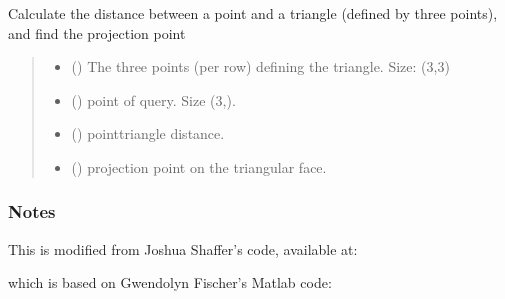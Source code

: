 \documentclass[letterpaper,10pt,english]{sphinxmanual}
\begin{document}
\begin{fulllineitems}
\label{\detokenize{_autosummary/nirfasterff.utils.pointTriangleDistance:nirfasterff.utils.pointTriangleDistance}}
\pysigstartsignatures
\pysiglinewithargsret
{}
{\sphinxparamcomma {}}
{}
\pysigstopsignatures
\sphinxAtStartPar
Calculate the distance between a point and a triangle (defined by three points), and find the projection point
\begin{quote}\begin{description}
\begin{itemize}
\item {} 
\sphinxAtStartPar
{} () \textendash{} The three points (per row) defining the triangle. Size: (3,3)

\item {} 
\sphinxAtStartPar
{} () \textendash{} point of query. Size (3,).

\end{itemize}

\sphinxAtStartPar
\begin{itemize}
\item {} 
\sphinxAtStartPar
{} () \textendash{} point\sphinxhyphen{}triangle distance.

\item {} 
\sphinxAtStartPar
{} () \textendash{} projection point on the triangular face.

\end{itemize}


\end{description}\end{quote}
\subsubsection*{Notes}

\sphinxAtStartPar
This is modified from Joshua Shaffer’s code, available at: 

\sphinxAtStartPar
which is based on Gwendolyn Fischer’s Matlab code: 

\end{fulllineitems}
\end{document}
